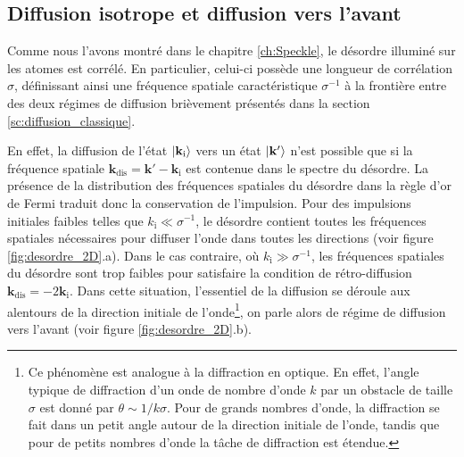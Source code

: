 \subsection{Diffusion isotrope et diffusion vers l'avant}
Comme nous l'avons montré dans le chapitre \ref{ch:Speckle}, le désordre illuminé sur les atomes est corrélé. En particulier, celui-ci possède une longueur de corrélation $\sigma$, définissant ainsi une fréquence spatiale caractéristique $\sigma^{-1}$ à la frontière entre des deux régimes de diffusion brièvement présentés dans la section \ref{sc:diffusion_classique}. 

En effet, la diffusion de l'état $\left| \mathbf{k}_{\mathrm{i}} \right\rangle$ vers un état $\left| \mathbf{k}' \right\rangle$ n'est possible que si la fréquence spatiale $\mathbf{k}_{\mathrm{dis}}=\mathbf{k}'-\mathbf{k}_{\mathrm{i}}$ est contenue dans le spectre du désordre. La présence de la distribution des fréquences spatiales du désordre dans la règle d'or de Fermi traduit donc la conservation de l'impulsion. Pour des impulsions initiales faibles telles que $k_{\mathrm{i}}\ll\sigma^{-1}$, le désordre contient toutes les fréquences spatiales nécessaires pour diffuser l'onde dans toutes les directions (voir figure \ref{fig:desordre_2D}.a). Dans le cas contraire, où $k_{\mathrm{i}}\gg\sigma^{-1}$, les fréquences spatiales du désordre sont trop faibles pour satisfaire la condition de rétro-diffusion $\mathbf{k}_{\mathrm{dis}}=-2 \mathbf{k}_{\mathrm{i}}$. Dans cette situation, l'essentiel de la diffusion se déroule aux alentours de la direction initiale de l'onde\footnote{Ce phénomène est analogue à la diffraction en optique. En effet, l'angle typique de diffraction d'un onde de nombre d'onde $k$ par un obstacle de taille $\sigma$ est donné par $\theta\sim 1/k\sigma$. Pour de grands nombres d'onde, la diffraction se fait dans un petit angle autour de la direction initiale de l'onde, tandis que pour de petits nombres d'onde la tâche de diffraction est étendue.}, on parle alors de régime de diffusion vers l'avant (voir figure \ref{fig:desordre_2D}.b). 

